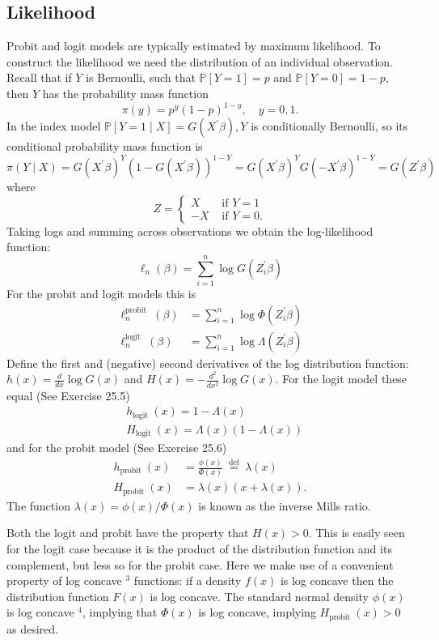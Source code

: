 \documentclass[10pt]{article}
\begin{document}
\subsection{Likelihood}
Probit and logit models are typically estimated by maximum likelihood. To construct the likelihood we need the distribution of an individual observation. Recall that if $Y$ is Bernoulli, such that $\mathbb{P}[Y=1]=p$ and $\mathbb{P}[Y=0]=1-p$, then $Y$ has the probability mass function
$$
\pi(y)=p^{y}(1-p)^{1-y}, \quad y=0,1 .
$$
In the index model $\mathbb{P}[Y=1 \mid X]=G\left(X^{\prime} \beta\right), Y$ is conditionally Bernoulli, so its conditional probability mass function is
$$
\pi(Y \mid X)=G\left(X^{\prime} \beta\right)^{Y}\left(1-G\left(X^{\prime} \beta\right)\right)^{1-Y}=G\left(X^{\prime} \beta\right)^{Y} G\left(-X^{\prime} \beta\right)^{1-Y}=G\left(Z^{\prime} \beta\right)
$$
where
$$
Z=\left\{\begin{array}{cc}
X & \text { if } Y=1 \\
-X & \text { if } Y=0 .
\end{array}\right.
$$
Taking logs and summing across observations we obtain the log-likelihood function:
$$
\ell_{n}(\beta)=\sum_{i=1}^{n} \log G\left(Z_{i}^{\prime} \beta\right)
$$
For the probit and logit models this is
$$
\begin{aligned}
\ell_{n}^{\text {probit }}(\beta) &=\sum_{i=1}^{n} \log \Phi\left(Z_{i}^{\prime} \beta\right) \\
\ell_{n}^{\text {logit }}(\beta) &=\sum_{i=1}^{n} \log \Lambda\left(Z_{i}^{\prime} \beta\right)
\end{aligned}
$$
Define the first and (negative) second derivatives of the log distribution function: $h(x)=\frac{d}{d x} \log G(x)$ and $H(x)=-\frac{d^{2}}{d x^{2}} \log G(x)$. For the logit model these equal (See Exercise 25.5)
$$
\begin{aligned}
&h_{\text {logit }}(x)=1-\Lambda(x) \\
&H_{\text {logit }}(x)=\Lambda(x)(1-\Lambda(x))
\end{aligned}
$$
and for the probit model (See Exercise 25.6)
$$
\begin{aligned}
h_{\text {probit }}(x) &=\frac{\phi(x)}{\Phi(x)} \stackrel{\text { def }}{=} \lambda(x) \\
H_{\text {probit }}(x) &=\lambda(x)(x+\lambda(x)) .
\end{aligned}
$$
The function $\lambda(x)=\phi(x) / \Phi(x)$ is known as the inverse Mills ratio.

Both the logit and probit have the property that $H(x)>0$. This is easily seen for the logit case because it is the product of the distribution function and its complement, but less so for the probit case. Here we make use of a convenient property of log concave ${ }^{3}$ functions: if a density $f(x)$ is log concave then the distribution function $F(x)$ is log concave. The standard normal density $\phi(x)$ is log concave ${ }^{4}$, implying that $\Phi(x)$ is log concave, implying $H_{\text {probit }}(x)>0$ as desired.
\end{document}
